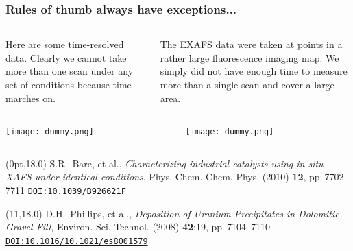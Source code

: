 \documentclass[10pt, xcolor=x11names, compress]{beamer}
\begin{document}
\begin{frame}
  \frametitle{Rules of thumb always have exceptions...}
  \small
  \begin{columns}[T]
    \begin{column}{0.5\linewidth}
      Here are some time-resolved data.  Clearly we cannot take more
      than one scan under any set of conditions because time marches on.        
    \end{column}
    \begin{column}{0.5\linewidth}
      The EXAFS data were taken at points in a rather large
      fluorescence imaging map.  We simply did not have enough time
      to measure more than a single scan and cover a large area.        
    \end{column}
  \end{columns}

  \medskip

  \begin{columns}[T]
    \begin{column}{0.5\linewidth}
      \texttt{[image: dummy.png]}
    \end{column}
    \begin{column}{0.5\linewidth}
      \texttt{[image: dummy.png]}
    \end{column}
  \end{columns}
  \begin{textblock*}{0.4\linewidth}(0pt,18.0\TPVertModule)%
    \tiny%
    S.R.\ Bare, et al., \textit{Characterizing industrial catalysts
      using in situ XAFS under identical conditions},
    Phys. Chem. Chem. Phys. (2010) \textbf{12}, pp\ 7702-7711
    \href{http://dx.doi.org/10.1039/B926621F}
    {\color{Blue4}\texttt{DOI:10.1039/B926621F}}
  \end{textblock*}
  \begin{textblock*}{0.4\linewidth}(11\TPHorizModule,18.0\TPVertModule)%
    \tiny%
    D.H.\ Phillips, et al., \textit{Deposition of Uranium Precipitates
      in Dolomitic Gravel Fill}, Environ. Sci. Technol. (2008)
    \textbf{42}:19, pp\ 7104–7110
    \href{http://dx.doi.org/10.1021/es8001579}
    {\color{Blue4}\texttt{DOI:10.1016/10.1021/es8001579}}
  \end{textblock*}
\end{frame}
\end{document}
